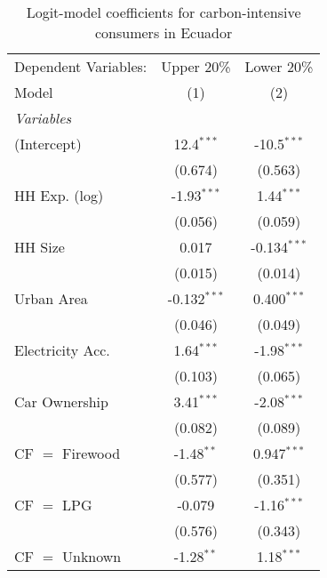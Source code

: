 
\begin{table}[htbp!]
   \centering
   \small
   \begin{adjustbox}{width = 1\textwidth, max height = 0.95\textheight, center}
      \begin{threeparttable}[b]
         \caption{\label{tab:Logit_1_ECU} Logit-model coefficients for carbon-intensive consumers in Ecuador}
         \begin{tabular}{lcc}
            \tabularnewline \midrule \midrule
            Dependent Variables: & Upper 20\%     & Lower 20\%\\   
            Model                & (1)            & (2)\\  
            \midrule
            \emph{Variables}\\
            (Intercept)          & 12.4$^{***}$   & -10.5$^{***}$\\   
                                 & (0.674)        & (0.563)\\   
            HH Exp. (log)        & -1.93$^{***}$  & 1.44$^{***}$\\   
                                 & (0.056)        & (0.059)\\   
            HH Size              & 0.017          & -0.134$^{***}$\\   
                                 & (0.015)        & (0.014)\\   
            Urban Area           & -0.132$^{***}$ & 0.400$^{***}$\\   
                                 & (0.046)        & (0.049)\\   
            Electricity Acc.     & 1.64$^{***}$   & -1.98$^{***}$\\   
                                 & (0.103)        & (0.065)\\   
            Car Ownership        & 3.41$^{***}$   & -2.08$^{***}$\\   
                                 & (0.082)        & (0.089)\\   
            CF $=$ Firewood      & -1.48$^{**}$   & 0.947$^{***}$\\   
                                 & (0.577)        & (0.351)\\   
            CF $=$ LPG           & -0.079         & -1.16$^{***}$\\   
                                 & (0.576)        & (0.343)\\   
            CF $=$ Unknown       & -1.28$^{**}$   & 1.18$^{***}$\\   

\end{tabular}
\end{threeparttable}
\end{adjustbox}
\end{table}
